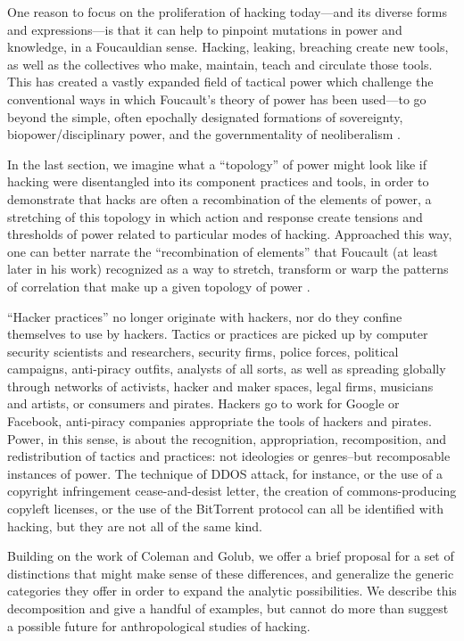 \documentclass[10pt,letter,oneside]{scrartcl}
\begin{document}
One reason to focus on the proliferation of hacking today---and its diverse
forms and expressions---is that it can help to pinpoint mutations in power and
knowledge, in a Foucauldian sense. Hacking, leaking, breaching create new tools,
as well as the collectives who make, maintain, teach and circulate those tools.
This has created a vastly expanded field of tactical power which challenge the
conventional ways in which Foucault's theory of power has been used---to go
beyond the simple, often epochally designated formations of sovereignty,
biopower/disciplinary power, and the governmentality of
neoliberalism \parencite{Macmillan2011a}.

In the last section, we imagine what a ``topology'' of power might look like if
hacking were disentangled into its component practices and tools, in order to
demonstrate that hacks are often a recombination of the elements of power, a
stretching of this topology in which action and response create tensions and
thresholds of power related to particular modes of hacking.  Approached this
way, one can better narrate the ``recombination of elements'' that Foucault (at
least later in his work) recognized as a way to stretch, transform or warp the
patterns of correlation that make up a given topology of power \parencite{Collier2009a}.

``Hacker practices'' no longer originate with hackers, nor do they confine
themselves to use by hackers.  Tactics or practices are picked up by computer
security scientists and researchers, security firms, police forces, political
campaigns, anti-piracy outfits, analysts of all sorts, as well as spreading
globally through networks of activists, hacker and maker spaces, legal firms,
musicians and artists, or consumers and pirates. Hackers go to work for Google
or Facebook, anti-piracy companies appropriate the tools of hackers and
pirates.  Power, in this sense, is about the recognition, appropriation,
recomposition, and redistribution of tactics and practices: not ideologies or
genres--but recomposable instances of power.  The technique of DDOS attack, for
instance, or the use of a copyright infringement cease-and-desist letter, the 
creation of commons-producing copyleft licenses, or the use of the 
BitTorrent protocol can all be identified with hacking, but they are not 
all of the same kind.

Building on the work of Coleman and Golub, we offer a brief proposal for
a set of distinctions that might make sense of these differences, and generalize
the generic categories they offer in order to expand the analytic
possibilities.  We describe this decomposition and give a handful of examples,
but cannot do more than suggest a possible future for anthropological studies of
hacking.  
\end{document}
